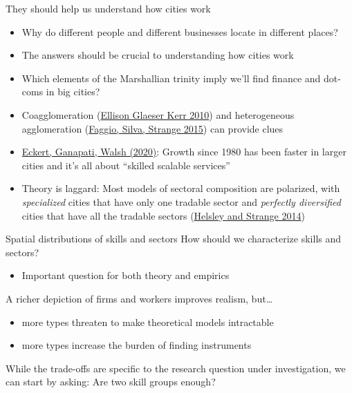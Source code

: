 \documentclass[11pt,notes=hide,aspectratio=169]{beamer}
\begin{document}
\begin{frame}{They should help us understand how cities work}
\begin{itemize}
	\item Why do different people and different businesses locate in different places?
	\item The answers should be crucial to understanding how cities work
	\item Which elements of the Marshallian trinity imply we'll find finance and dot-coms in big cities?
	\item Coagglomeration (\href{https://www.aeaweb.org/articles.php?doi=10.1257/aer.100.3.1195}{Ellison Glaeser Kerr 2010}) and heterogeneous agglomeration (\href{https://ideas.repec.org/p/ehl/lserod/58426.html}{Faggio, Silva, Strange 2015}) can provide clues
	\item \href{https://papers.ssrn.com/sol3/papers.cfm?abstract_id=3736487}{Eckert, Ganapati, Walsh (2020)}: Growth since 1980 has been faster in larger cities and it's all about ``skilled scalable services''
	\item Theory is laggard: Most models of sectoral composition are polarized, with \emph{specialized} cities that have only one tradable sector and \emph{perfectly diversified} cities that have all the tradable sectors (\href{http://www.jstor.org/stable/10.1086/676557}{Helsley and Strange 2014})
\end{itemize}
\end{frame}
\begin{frame}{Spatial distributions of skills and sectors}
How should we characterize skills and sectors?
\begin{itemize}
	\item Important question for both theory and empirics
\end{itemize}
A richer depiction of firms and workers improves realism, but\dots
\begin{itemize}
	\item more types threaten to make theoretical models intractable
	\item more types increase the burden of finding instruments
\end{itemize}
While the trade-offs are specific to the research question under investigation, we can start by asking: Are two skill groups enough?
\end{frame}
\end{document}
